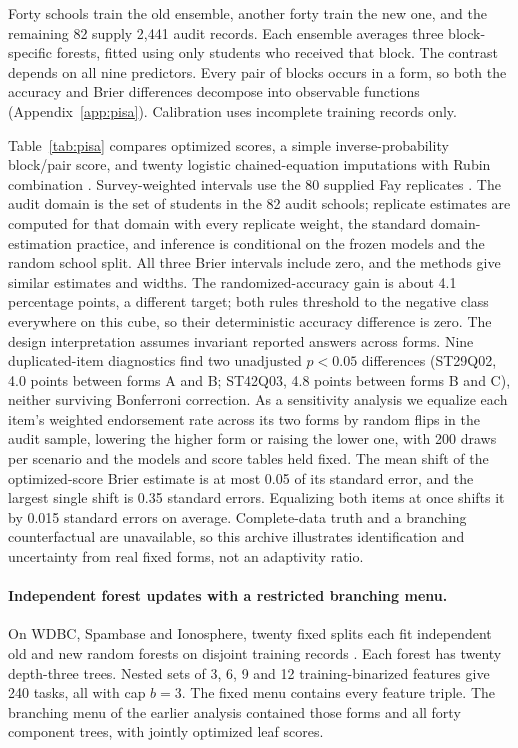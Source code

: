 Forty schools train the old ensemble, another forty train the new one, and the remaining 82 supply 2,441 audit records. Each ensemble averages three block-specific forests, fitted using only students who received that block. The contrast depends on all nine predictors. Every pair of blocks occurs in a form, so both the accuracy and Brier differences decompose into observable functions (Appendix~\ref{app:pisa}). Calibration uses incomplete training records only.



Table~\ref{tab:pisa} compares optimized scores, a simple inverse-probability block/pair score, and twenty logistic chained-equation imputations with Rubin combination \citep{vanbuuren2011}. Survey-weighted intervals use the 80 supplied Fay replicates \citep{kastberg2014}. The audit domain is the set of students in the 82 audit schools; replicate estimates are computed for that domain with every replicate weight, the standard domain-estimation practice, and inference is conditional on the frozen models and the random school split. All three Brier intervals include zero, and the methods give similar estimates and widths. The randomized-accuracy gain is about 4.1 percentage points, a different target; both rules threshold to the negative class everywhere on this cube, so their deterministic accuracy difference is zero. The design interpretation assumes invariant reported answers across forms. Nine duplicated-item diagnostics find two unadjusted $p<0.05$ differences (ST29Q02, 4.0 points between forms A and B; ST42Q03, 4.8 points between forms B and C), neither surviving Bonferroni correction. As a sensitivity analysis we equalize each item's weighted endorsement rate across its two forms by random flips in the audit sample, lowering the higher form or raising the lower one, with 200 draws per scenario and the models and score tables held fixed. The mean shift of the optimized-score Brier estimate is at most 0.05 of its standard error, and the largest single shift is 0.35 standard errors. Equalizing both items at once shifts it by 0.015 standard errors on average. Complete-data truth and a branching counterfactual are unavailable, so this archive illustrates identification and uncertainty from real fixed forms, not an adaptivity ratio.

\paragraph{Independent forest updates with a restricted branching menu.}
On WDBC, Spambase and Ionosphere, twenty fixed splits each fit independent old and new random forests on disjoint training records \citep{wolberg1993,spambase1999,ionosphere1989}. Each forest has twenty depth-three trees. Nested sets of 3, 6, 9 and 12 training-binarized features give 240 tasks, all with cap $b=3$. The fixed menu contains every feature triple. The branching menu of the earlier analysis contained those forms and all forty component trees, with jointly optimized leaf scores.

